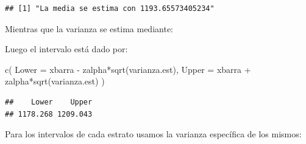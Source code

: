 \documentclass[
]{book}
\newenvironment{Shaded}{\begin{snugshade}}{\end{snugshade}}
\newcommand{\AttributeTok}[1]{\textcolor[rgb]{0.77,0.63,0.00}{#1}}
\newcommand{\DecValTok}[1]{\textcolor[rgb]{0.00,0.00,0.81}{#1}}
\newcommand{\FunctionTok}[1]{\textcolor[rgb]{0.00,0.00,0.00}{#1}}
\newcommand{\NormalTok}[1]{#1}
\newcommand{\OtherTok}[1]{\textcolor[rgb]{0.56,0.35,0.01}{#1}}
\newcommand{\SpecialCharTok}[1]{\textcolor[rgb]{0.00,0.00,0.00}{#1}}
\begin{document}
\begin{verbatim}
## [1] "La media se estima con 1193.65573405234"
\end{verbatim}

Mientras que la varianza se estima mediante:

\begin{Shaded}
\end{Shaded}

Luego el intervalo está dado por:

\begin{Shaded}
\begin{Highlighting}[]
\FunctionTok{c}\NormalTok{(}
  \AttributeTok{Lower =}\NormalTok{ xbarra }\SpecialCharTok{{-}}\NormalTok{ zalpha}\SpecialCharTok{*}\FunctionTok{sqrt}\NormalTok{(varianza.est),}
  \AttributeTok{Upper =}\NormalTok{ xbarra }\SpecialCharTok{+}\NormalTok{ zalpha}\SpecialCharTok{*}\FunctionTok{sqrt}\NormalTok{(varianza.est)}
\NormalTok{)}
\end{Highlighting}
\end{Shaded}

\begin{verbatim}
##    Lower    Upper 
## 1178.268 1209.043
\end{verbatim}

Para los intervalos de cada estrato usamos la varianza específica de los mismos:
\end{document}
